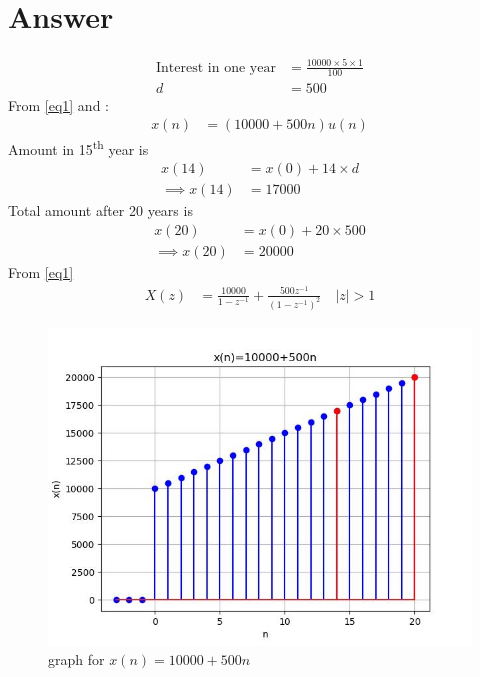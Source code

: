 \documentclass[journal,12pt,twocolumn]{IEEEtran}
\theoremstyle{remark}
\begin{document}
\section*{Answer}

\begin{align}
\text{Interest in one year} &= \frac{10000\times5\times1}{100}\\    
    d &= 500\label{eq1}
\end{align}
From \eqref{eq1} and :
    \begin{align}
        x(n) &= (10000 + 500n)u(n)
    \end{align}
Amount in 15\textsuperscript{th} year is
    \begin{align}
        x(14) &= x(0) + 14\times d\\
        \implies x(14) &= 17000
    \end{align}
Total amount after 20 years is
    \begin{align}
        x(20) &= x(0) + 20\times 500\\
        \implies x(20) &= 20000
    \end{align}
From \eqref{eq1}
    \begin{align}
        X(z) &= \frac{10000}{1-z^{-1}} + \frac{500z^{-1}}{(1-z^{-1})^2} \quad |z|>1
    \end{align}
    \begin{figure}[h]
    \renewcommand\thefigure{1}
        \centering
        \includegraphics[width=1\linewidth]{figs/p.jpeg}
        \caption{graph for $x(n) = 10000 + 500n$}
        \label{graph}
    \end{figure}
\end{document}
